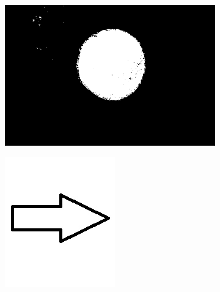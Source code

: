 \documentclass{article}
\begin{document}
\begin{figure}[H]
\begin{subfigure}{.47\textwidth}
  \centering
  \includegraphics[width=0.97\linewidth]{_Figures/raw_data_4_binary.png}
  \caption{}
  \label{fig:raw_4}
\end{subfigure}%
\begin{subfigure}{.09\textwidth}
  \centering
  \includegraphics[width=0.97\linewidth]{_Figures/leftrightarrow.jpg}

\end{subfigure}
\end{figure}
\end{document}
